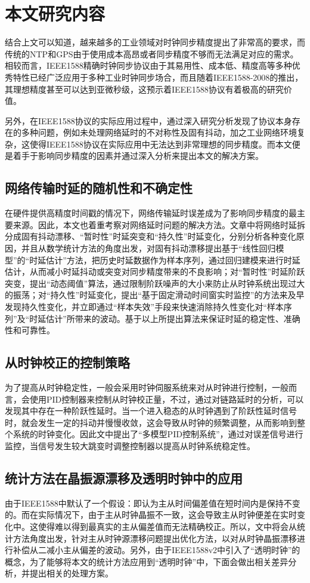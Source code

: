 \section{本文研究内容}
结合上文可以知道，越来越多的工业领域对时钟同步精度提出了非常高的要求，而传统的NTP和GPS由于使用成本高昂或者同步精度不够而无法满足对应的需求。相较而言，IEEE1588精确时钟同步协议由于其易用性、成本低、精度高等多种优秀特性已经广泛应用于多种工业时钟同步场合，而且随着IEEE1588-2008的推出，其理想精度甚至可以达到亚微秒级，这预示着IEEE1588协议有着极高的研究价值。

另外，在IEEE1588协议的实际应用过程中，通过深入研究分析发现了协议本身存在的多种问题，例如未处理网络延时的不对称性及固有抖动，加之工业网络环境复杂，这使得IEEE1588协议在实际应用中无法达到非常理想的同步精度。而本文便是着手于影响同步精度的因素并通过深入分析来提出本文的解决方案。

\subsection{网络传输时延的随机性和不确定性}
在硬件提供高精度时间戳的情况下，网络传输延时误差成为了影响同步精度的最主要来源。因此，本文也着重考察对网络延时问题的解决方法。文章中将网络时延拆分成固有抖动漂移、“暂时性”时延突变和“持久性”时延变化，分别分析各种变化原因，并且从数学统计方法的角度出发，对固有抖动漂移提出基于“线性回归模型”的“时延估计”方法，把历史时延数据作为样本序列，通过回归建模来进行时延估计，从而减小时延抖动或突变对同步精度带来的不良影响；对“暂时性”时延阶跃突变，提出“动态阈值”算法，通过限制阶跃噪声的大小来防止从时钟系统出现过大的振荡；对“持久性”时延变化，提出“基于固定滑动时间窗实时监控”的方法来及早发现持久性变化，并立即通过“样本失效”手段来快速消除持久性变化对“样本序列”及“时延估计”所带来的波动。基于以上所提出算法来保证时延的稳定性、准确性和可靠性。

\subsection{从时钟校正的控制策略}
为了提高从时钟稳定性，一般会采用时钟伺服系统来对从时钟进行控制，一般而言，会使用PID控制器来控制从时钟校正量，不过，通过对链路延时的分析，可以发现其中存在一种阶跃性延时。当一个进入稳态的从时钟遇到了阶跃性延时信号时，就会发生一定的抖动并慢慢收敛，这会导致从时钟的频繁调整，从而影响到整个系统的时钟变化。因此文中提出了“多模型PID控制系统”，通过对误差信号进行监控，当信号发生较大跳变时调整控制器以提高从时钟系统稳定性。

\subsection{统计方法在晶振源漂移及透明时钟中的应用}
由于IEEE1588中默认了一个假设：即认为主从时间偏差值在短时间内是保持不变的。而在实际情况下，由于主从时钟晶振不一致，这会导致主从时钟便差在实时变化中。这使得难以得到最真实的主从偏差值而无法精确校正。所以，文中将会从统计方法角度出发，针对主从时钟源漂移问题提出优化方法，以对从时钟晶振漂移进行补偿从二减小主从偏差的波动。另外，由于IEEE1588v2中引入了“透明时钟”的概念，为了能够将本文的统计方法应用到“透明时钟”中，下面会做出相关差异分析，并提出相关的处理方案。


